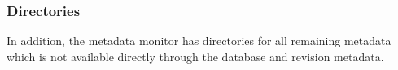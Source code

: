 \documentclass[a4paper, 10pt]{book}
\begin{document}


                                \subsubsection{Directories}

                                In addition, the metadata monitor has directories for all remaining
                                metadata which is not available directly through the database and
                                revision metadata.
\end{document}
